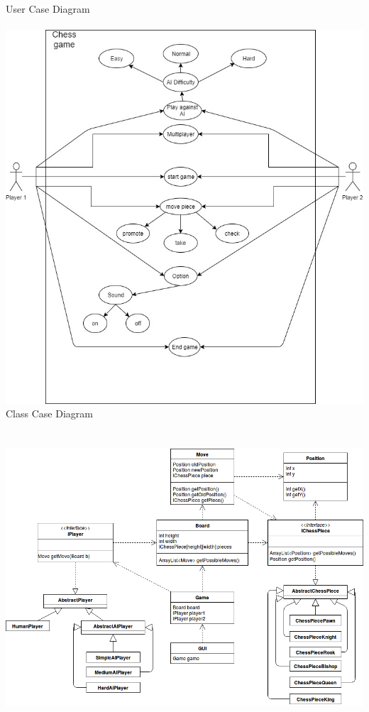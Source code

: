 \documentclass{article}
\begin{document}
\LARGE
\newpage
\hspace*{+2,5cm} 
User Case Diagram
\\\\
\hspace*{-2cm}  
\includegraphics[scale=0.60]{usercasediagram}
\newpage
\noindent
\hspace*{+2,5cm} 
Class Case Diagram
\\\\\\
\hspace*{-4,5cm}  
\includegraphics[scale=0.6]{classdiagram2}
\end{document}
